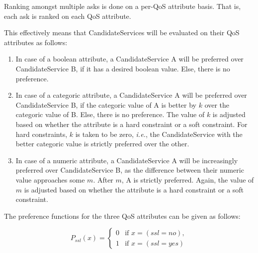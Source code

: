 \documentclass[10pt,journal,compsoc]{IEEEtran}
\begin{document}
Ranking amongst multiple asks is done on a per-QoS attribute basis. That is, each ask is ranked on each QoS attribute. 
% 

This effectively means that CandidateServices will be evaluated on their QoS attributes as follows:
\begin{enumerate}
		\item In case of a boolean attribute, a CandidateService A will be preferred over CandidateService B, if it has a desired boolean value. Else, there is no preference.
		\item In case of a categoric attribute, a CandidateService A will be preferred over CandidateService B, if the categoric value of A is better by $k$ over the categoric value of B. Else, there is no preference. The value of $k$ is adjusted based on whether the attribute is a hard constraint or a soft constraint. For hard constraints, $k$ is taken to be zero, \textit{i.e.}, the CandidateService with the better categoric value is strictly preferred over the other. 
		\item In case of a numeric attribute, a CandidateService A will be increasingly preferred over CandidateService B, as the difference between their numeric value approaches some $m$. After $m$, A is strictly preferred. Again, the value of $m$ is adjusted based on whether the attribute is a hard constraint or a soft constraint. 
	\end{enumerate}
	
	The preference functions for the three QoS attributes can be given as follows:
	
	\begin{equation}
		P_{ssl}(x) = \begin{cases} 0 &\mbox{if } x = (ssl=no),\\ 
							1 &\mbox{if } x = (ssl=yes) \end{cases}
			\label{pref_ssl}
	\end{equation}
\end{document}
